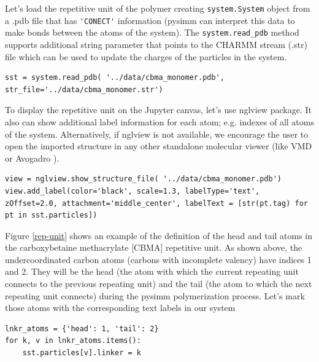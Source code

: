 \documentclass[9pt,tutorial]{livecoms}
\begin{document}
Let's load the repetitive unit of the polymer creating \lstinline$system.System$ object from a .pdb file that has \lstinline$'CONECT'$ information (pysimm can interpret this data to make bonds between the atoms of the system). The \lstinline$system.read_pdb$ method supports additional string parameter that points to the CHARMM stream (.str) file which can be used to update the charges of the particles in the system.

\begin{lstlisting}
sst = system.read_pdb( '../data/cbma_monomer.pdb', str_file='../data/cbma_monomer.str')
\end{lstlisting}

To display the repetitive unit on the Jupyter canvas, let's use nglview package. It also can show additional label information for each atom; e.g. indexes of all atoms of the system. Alternatively, if nglview is not available, we encourage the user to open the imported structure in any other standalone molecular viewer (like VMD \cite{vmd} or Avogadro \cite{avogadro}). 

\begin{lstlisting}
view = nglview.show_structure_file( '../data/cbma_monomer.pdb')
view.add_label(color='black', scale=1.3, labelType='text', zOffset=2.0, attachment='middle_center', labelText = [str(pt.tag) for pt in sst.particles])
\end{lstlisting}


Figure \ref{rep-unit} shows an example of the definition of the head and tail atoms in the carboxybetaine methacrylate [CBMA] repetitive unit. As shown above, the undercoordinated carbon atoms (carbons with incomplete valency) have indices 1 and 2. They will be the head (the atom with which the current repeating unit connects to the previous repeating unit) and the tail (the atom to which the next repeating unit connects) during the pysimm polymerization process. Let's mark those atoms with the corresponding text labels in our system

\begin{lstlisting}
lnkr_atoms = {'head': 1, 'tail': 2}
for k, v in lnkr_atoms.items():
    sst.particles[v].linker = k
\end{lstlisting}
\end{document}
